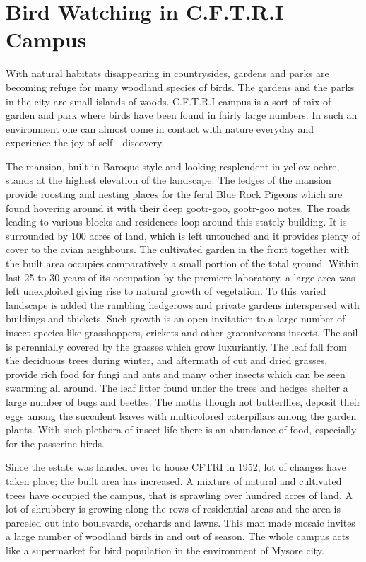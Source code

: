 \chapter{Bird Watching in C.F.T.R.I Campus}

With natural habitats disappearing in countrysides, gardens and parks 
are becoming refuge for many woodland species of birds. The gardens and 
the parks in the city are small islands of woods. C.F.T.R.I campus is a sort of 
mix of garden and park where birds have been found in fairly large numbers. 
In such an environment one can almost come in contact with nature 
everyday and experience the joy of self - discovery. 

The mansion, built in Baroque style and looking resplendent in yellow 
ochre, stands at the highest elevation of the landscape. The ledges of the 
mansion provide roosting and nesting places for the feral Blue Rock Pigeons 
which are found hovering around it with their deep gootr-goo, gootr-goo 
notes. The roads leading to various blocks and residences loop around this 
stately building. It is surrounded by 100 acres of land, which is left 
untouched and it provides plenty of cover to the avian neighbours. The 
cultivated garden in the front together with the built area occupies 
comparatively a small portion of the total ground. Within last 25 to 30 years 
of its occupation by the premiere laboratory, a large area was left 
unexploited giving rise to natural growth of vegetation. To this varied 
landscape is added the rambling hedgerows and private gardens interspersed 
with buildings and thickets. Such growth is an open invitation to a large 
number of insect species like grasshoppers, crickets and other gramnivorous 
insects. The soil is perennially covered by the grasses which grow 
luxuriantly. The leaf fall from the deciduous trees during winter, and 
aftermath of cut and dried grasses, provide rich food for fungi and ants and 
many other insects which can be seen swarming all around. The leaf litter 
found under the trees and hedges shelter a large number of bugs and beetles. 
The moths though not butterflies, deposit their eggs among the succulent 
leaves with multicolored caterpillars among the garden plants. With such 
plethora of insect life there is an abundance of food, especially for the 
passerine birds. 

Since the estate was handed over to house CFTRI in 1952, lot of 
changes have taken place; the built area has increased. A mixture of natural 
and cultivated trees have occupied the campus, that is sprawling over hundred 
acres of land. A lot of shrubbery is growing along the rows of residential 
areas and the area is parceled out into boulevards, orchards and lawns. This 
man made mosaic invites a large number of woodland birds in and out of 
season. The whole campus acts like a supermarket for bird population in 
the environment of Mysore city. 

